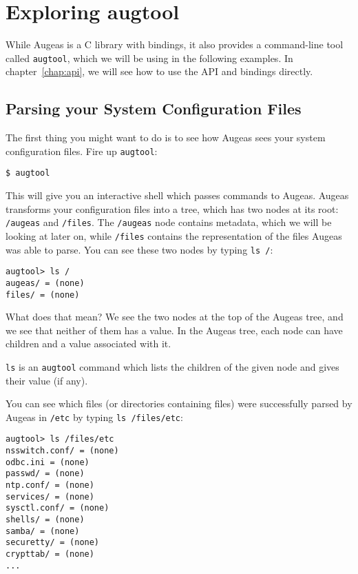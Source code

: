 \chapter{Exploring augtool}


While Augeas is a C library with bindings, it also provides a command-line tool called \verb!augtool!, which we will be using in the following examples. In chapter~\ref{chap:api}, we will see how to use the API and bindings directly.


\section{Parsing your System Configuration Files}

The first thing you might want to do is to see how Augeas sees your system configuration files. Fire up \verb!augtool!:

\begin{verbatim}
$ augtool
\end{verbatim}

This will give you an interactive shell which passes commands to Augeas. Augeas transforms your configuration files into a tree, which has two nodes at its root: \verb!/augeas! and \verb!/files!. The \verb!/augeas! node contains metadata, which we will be looking at later on, while \verb!/files! contains the representation of the files Augeas was able to parse. You can see these two nodes by typing \verb!ls /!:


\begin{verbatim}
augtool> ls /
augeas/ = (none)
files/ = (none)
\end{verbatim}

What does that mean? We see the two nodes at the top of the Augeas tree, and we see that neither of them has a value. In the Augeas tree, each node can have children and a value associated with it.

\verb!ls! is an \verb!augtool! command which lists the children of the given node and gives their value (if any).

You can see which files (or directories containing files) were successfully parsed by Augeas in \verb!/etc! by typing \verb!ls /files/etc!:

\begin{verbatim}
augtool> ls /files/etc
nsswitch.conf/ = (none)
odbc.ini = (none)
passwd/ = (none)
ntp.conf/ = (none)
services/ = (none)
sysctl.conf/ = (none)
shells/ = (none)
samba/ = (none)
securetty/ = (none)
crypttab/ = (none)
...
\end{verbatim}

